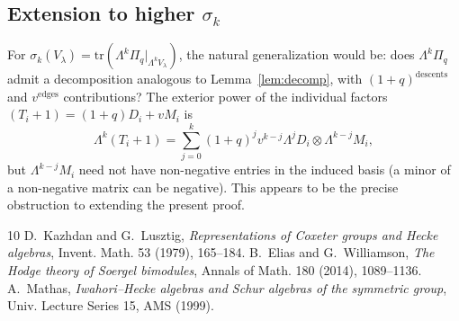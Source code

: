 \documentclass[11pt]{article}
\theoremstyle{plain}
\theoremstyle{definition}
\theoremstyle{remark}
\newcommand{\Pibs}{\Pi_q}
\newcommand{\Vlam}{V_\lambda}
\newcommand{\trace}{\mathrm{tr}}
\begin{document}
\subsection*{Extension to higher $\sigma_k$}
For $\sigma_k(\Vlam) = \trace(\Lambda^k \Pibs|_{\Lambda^k \Vlam})$, the natural generalization would be: does $\Lambda^k \Pibs$ admit a decomposition analogous to Lemma~\ref{lem:decomp}, with $(1+q)^{\text{descents}}$ and $v^{\text{edges}}$ contributions? The exterior power of the individual factors $(T_i + 1) = (1+q) D_i + v M_i$ is
\[
\Lambda^k(T_i + 1) = \sum_{j=0}^{k} (1+q)^j v^{k-j} \Lambda^j D_i \otimes \Lambda^{k-j} M_i,
\]
but $\Lambda^{k-j} M_i$ need not have non-negative entries in the induced basis (a minor of a non-negative matrix can be negative). This appears to be the precise obstruction to extending the present proof.

\begin{thebibliography}{10}
 D.~Kazhdan and G.~Lusztig, \emph{Representations of Coxeter groups and Hecke algebras}, Invent. Math. 53 (1979), 165--184.
 B.~Elias and G.~Williamson, \emph{The Hodge theory of Soergel bimodules}, Annals of Math. 180 (2014), 1089--1136.
 A.~Mathas, \emph{Iwahori--Hecke algebras and Schur algebras of the symmetric group}, Univ. Lecture Series 15, AMS (1999).
\end{thebibliography}
\end{document}

